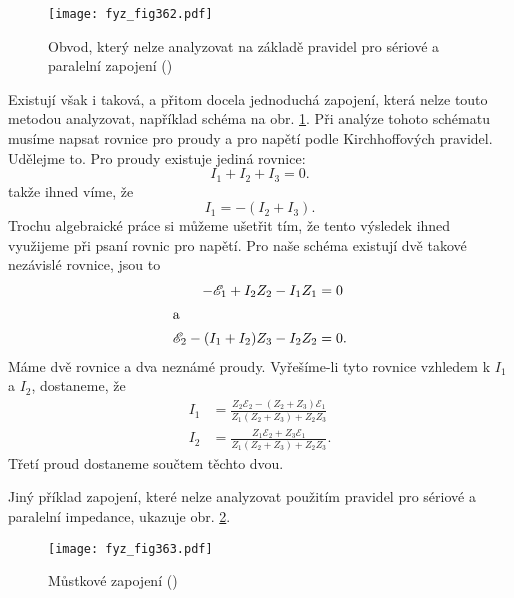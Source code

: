   \begin{figure}[ht!] %
    \centering
    \texttt{[image: fyz\_fig362.pdf]}
    \caption{Obvod, který nelze analyzovat na základě pravidel pro sériové a paralelní zapojení
             (\cite[s.~403]{Feynman02})}
    \label{fyz:fig362}
  \end{figure}
   
  Existují však i taková, a přitom docela jednoduchá zapojení, která nelze touto metodou 
  analyzovat, například schéma na obr. \ref{fyz:fig362}. Při analýze tohoto schématu musíme napsat 
  rovnice pro proudy a pro napětí podle Kirchhoffových pravidel. Udělejme to. Pro proudy existuje 
  jediná rovnice:
  \begin{equation*}
    I_1 + I_2 + I_3 = 0.
  \end{equation*}
  takže ihned víme, že
  \begin{equation*}
    I_1 = - (I_2 + I_3).
  \end{equation*}
  Trochu algebraické práce si můžeme ušetřit tím, že tento výsledek ihned využijeme při psaní 
  rovnic pro napětí. Pro naše schéma existují dvě takové nezávislé rovnice, jsou to
  \begin{align*}
   -\mathscr{E}_1 + I_2Z_2 - I_1Z_1         &= 0 \\
   \shortintertext{a}
    \mathscr{E}_2 - (I_1 + I_2)Z_3 - I_2Z_2 &= 0.
  \end{align*}
  Máme dvě rovnice a dva neznámé proudy. Vyřešíme-li tyto rovnice vzhledem k \(I_1\) a \(I_2\), 
  dostaneme,  že 
  \begin{subequations}\label{fyz:eq491}
    \begin{align}
      I_1 &=\frac{Z_2\mathscr{E}_2-(Z_2+Z_3)\mathscr{E}_1}{Z_1(Z_2+Z_3)+Z_2Z_3}\label{fyz:eq491a} \\
      I_2 &=\frac{Z_1\mathscr{E}_2+Z_3\mathscr{E}_1}{Z_1(Z_2+Z_3)+Z_2Z_3}.     \label{fyz:eq491b}
    \end{align}
  \end{subequations}
  Třetí proud dostaneme součtem těchto dvou.
  
  Jiný příklad zapojení, které nelze analyzovat použitím pravidel pro sériové a paralelní 
  impedance, ukazuje obr. \ref{fyz:fig363}.
  
  
  \begin{figure}[ht!] %
    \centering
    \texttt{[image: fyz\_fig363.pdf]}
    \caption{Můstkové zapojení
             (\cite[s.~403]{Feynman02})}
    \label{fyz:fig363}
  \end{figure}
  
